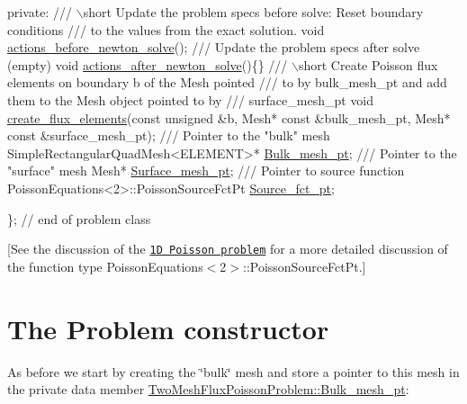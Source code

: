 \begin{DoxyCodeInclude}
\textcolor{keyword}{private}:
\textcolor{comment}{}
\textcolor{comment}{ /// \(\backslash\)short Update the problem specs before solve: Reset boundary conditions}
\textcolor{comment}{ /// to the values from the exact solution.}
\textcolor{comment}{} \textcolor{keywordtype}{void} \hyperlink{classTwoMeshFluxPoissonProblem_a520768a954d00d3972115ccf0b304854}{actions\_before\_newton\_solve}();
\textcolor{comment}{}
\textcolor{comment}{ /// Update the problem specs after solve (empty)}
\textcolor{comment}{} \textcolor{keywordtype}{void} \hyperlink{classTwoMeshFluxPoissonProblem_a9b3da753ba1d924b920e2e67779e7453}{actions\_after\_newton\_solve}()\{\}
\textcolor{comment}{}
\textcolor{comment}{ /// \(\backslash\)short Create Poisson flux elements on boundary b of the Mesh pointed}
\textcolor{comment}{ /// to by bulk\_mesh\_pt and add them to the Mesh object pointed to by }
\textcolor{comment}{ /// surface\_mesh\_pt}
\textcolor{comment}{} \textcolor{keywordtype}{void} \hyperlink{classTwoMeshFluxPoissonProblem_a6729e6d9cf920e0880603fa9920ab28c}{create\_flux\_elements}(\textcolor{keyword}{const} \textcolor{keywordtype}{unsigned} &b, Mesh* \textcolor{keyword}{const} &bulk\_mesh\_pt,
                           Mesh* \textcolor{keyword}{const} &surface\_mesh\_pt);
\textcolor{comment}{}
\textcolor{comment}{ /// Pointer to the "bulk" mesh}
\textcolor{comment}{} SimpleRectangularQuadMesh<ELEMENT>* \hyperlink{classTwoMeshFluxPoissonProblem_abd0718261b6c8586d5de35cfef2292d8}{Bulk\_mesh\_pt};
\textcolor{comment}{}
\textcolor{comment}{ /// Pointer to the "surface" mesh}
\textcolor{comment}{} Mesh* \hyperlink{classTwoMeshFluxPoissonProblem_a96b1ff6102eceb5ce432ac9197f68283}{Surface\_mesh\_pt};
\textcolor{comment}{}
\textcolor{comment}{ /// Pointer to source function}
\textcolor{comment}{} PoissonEquations<2>::PoissonSourceFctPt \hyperlink{classTwoMeshFluxPoissonProblem_a56a27b0dbf0f5975a4b9d37f3985c364}{Source\_fct\_pt};

\}; \textcolor{comment}{// end of problem class}

\end{DoxyCodeInclude}


\mbox{[}See the discussion of the \href{../../one_d_poisson/html/index.html}{\tt 1D Poisson problem} for a more detailed discussion of the function type Poisson\+Equations$<$2$>$\+::\+Poisson\+Source\+Fct\+Pt.\mbox{]}



 

\hypertarget{index_constructor}{}\section{The Problem constructor}\label{index_constructor}
As before we start by creating the \char`\"{}bulk\char`\"{} mesh and store a pointer to this mesh in the private data member {\ttfamily \hyperlink{classTwoMeshFluxPoissonProblem_abd0718261b6c8586d5de35cfef2292d8}{Two\+Mesh\+Flux\+Poisson\+Problem\+::\+Bulk\+\_\+mesh\+\_\+pt}\+:} 


